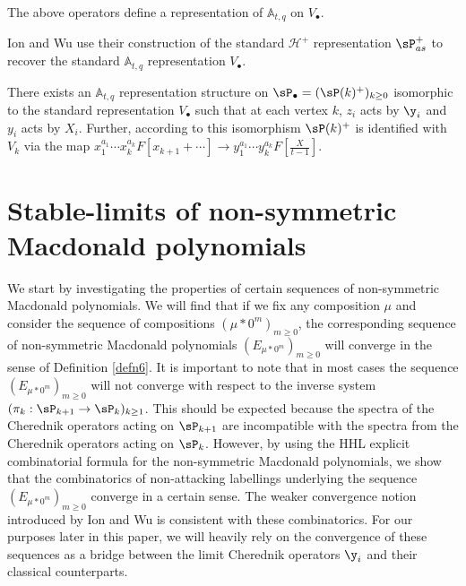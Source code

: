 \begin{thm}[{\cite[Thm. 7.3]{CM_2015}}]
    The above operators define a representation of $\mathbb{A}_{t,q}$ on $V_{\bullet}.$
\end{thm}


Ion and Wu use their construction of the standard $\mathscr{H}^{+}$ representation $\sP_{as}^{+}$ to recover the standard $\mathbb{A}_{t,q}$ representation $V_{\bullet}.$

\begin{thm}
  There exists an $\mathbb{A}_{t,q}$ representation structure on $\sP_{\bullet} = (\sP(k)^{+})_{k\geq 0}$ isomorphic to the standard representation $V_{\bullet}$ such that at each vertex $k$, $z_i$ acts by $\y_i$ and $y_i$ acts by $X_i$. Further, according to this isomorphism $\sP(k)^{+}$ is identified with $V_k$ via the map $x_1^{a_1}\cdots x_k^{a_k}F[x_{k+1}+ \cdots] \rightarrow y_1^{a_1}\cdots y_k^{a_k}F[\frac{X}{t-1}].$
\end{thm} 

\section{Stable-limits of non-symmetric Macdonald polynomials}\label{stable limits of macD poly}

We start by investigating the properties of certain sequences of non-symmetric Macdonald polynomials. We will find that if we fix any composition $\mu$ and consider the sequence of compositions $(\mu*0^m)_{m\geq 0}$, the corresponding sequence of non-symmetric Macdonald polynomials $(E_{\mu*0^m})_{m\geq 0}$ will converge in the sense of Definition \ref{defn6}. It is important to note that in most cases the sequence $(E_{\mu*0^m})_{m\geq 0}$ will not converge with respect to the inverse system $(\pi_{k}: \sP_{k+1} \rightarrow \sP_{k})_{k\geq 1}$. This should be expected because the spectra of the Cherednik operators acting on $\sP_{k+1}$ are incompatible with the spectra from the Cherednik operators acting on $\sP_{k}$. However, by using the HHL explicit combinatorial formula for the non-symmetric Macdonald polynomials, we show that the combinatorics of non-attacking labellings underlying the sequence $(E_{\mu*0^m})_{m\geq 0}$ converge in a certain sense. The weaker convergence notion introduced by Ion and Wu is consistent with these combinatorics. For our purposes later in this paper, we will heavily rely on the convergence of these sequences as a bridge between the limit Cherednik operators $\y_i$ and their classical counterparts.
 

